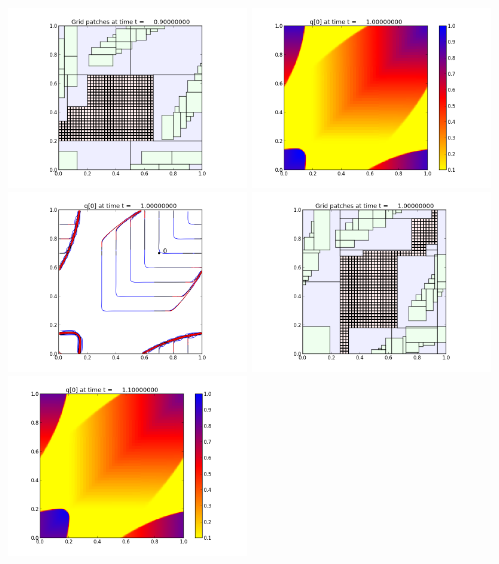 \documentclass[11pt]{article}
\begin{document}
\vskip 10pt 
\includegraphics[width=0.475\textwidth]{frame0009fig2.png}
\vskip 10pt 
\includegraphics[width=0.475\textwidth]{frame0010fig0.png}
\includegraphics[width=0.475\textwidth]{frame0010fig1.png}
\vskip 10pt 
\includegraphics[width=0.475\textwidth]{frame0010fig2.png}
\vskip 10pt 
\includegraphics[width=0.475\textwidth]{frame0011fig0.png}
\end{document}
